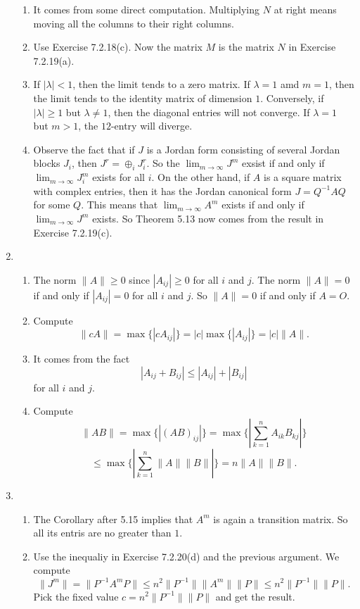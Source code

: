 \begin{enumerate}
\begin{enumerate}
\item It comes from some direct computation. Multiplying $N$ at right means moving all the columns to their right columns.
\item Use Exercise 7.2.18(c). Now the matrix $M$ is the matrix $N$ in Exercise 7.2.19(a).
\item If $|\lambda |<1$, then the limit tends to a zero matrix. If $\lambda=1$ amd $m=1$, then the limit tends to the identity matrix of dimension $1$. Conversely, if $|\lambda|\geq 1$ but $\lambda\neq 1$, then the diagonal entries will not converge. If $\lambda=1$ but $m>1$, the $12$-entry will diverge.
\item Observe the fact that if $J$ is a Jordan form consisting of several Jordan blocks $J_i$, then $J^r=\oplus_iJ_i^r$. So the $\lim_{m\rightarrow \infty}J^m$ exsist if and only if $\lim_{m\rightarrow \infty}J_i^m$ exists for all $i$. On the other hand, if $A$ is a square matrix with complex entries, then it has the Jordan canonical form $J=Q^{-1}AQ$ for some $Q$. This means that $\lim_{m\rightarrow \infty}A^m$ exists if and only if $\lim_{m\rightarrow \infty}J^m$ exists. So Theorem 5.13 now comes from the result in Exercise 7.2.19(c).
\end{enumerate}
\item \begin{enumerate}
\item The norm $\|A\|\geq 0$ since $|A_{ij}|\geq 0$ for all $i$ and $j$. The norm $\|A\|=0$ if and only if $|A_{ij}|=0$ for all $i$ and $j$. So $\|A\|=0$ if and only if $A=O$.
\item Compute 
\[\|cA\|=\max\{|cA_{ij}|\}=|c|\max\{|A_{ij}|\}=|c|\|A\|.\]
\item It comes from the fact 
\[|A_{ij}+B_{ij}|\leq |A_{ij}|+|B_{ij}|\]
for all $i$ and $j$.
\item Compute 
\[\|AB\|=\max\{|(AB)_{ij}|\}=\max\{|\sum_{k=1}^nA_{ik}B_{kj}|\}\]
\[\leq \max\{|\sum_{k=1}^n\|A\|\|B\||\}=n\|A\|\|B\|.\]
\end{enumerate}
\item \begin{enumerate}
\item The Corollary after 5.15 implies that $A^m$ is again a transition matrix. So all its entris are no greater than $1$.
\item Use the inequaliy in Exercise 7.2.20(d) and the previous argument. We compute
\[\|J^m\|=\|P^{-1}A^mP\|\leq n^2\|P^{-1}\|\|A^m\|\|P\|\leq n^2\|P^{-1}\|\|P\|.\]
Pick the fixed value $c=n^2\|P^{-1}\|\|P\|$ and get the result.

\end{enumerate}
\end{enumerate}
